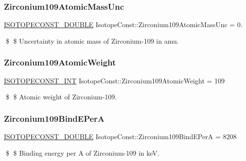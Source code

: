 \subsubsection{\texorpdfstring{Zirconium109\+Atomic\+Mass\+Unc}{Zirconium109AtomicMassUnc}}
{\footnotesize\ttfamily \mbox{\hyperlink{group___isotope_const-_macros_ga8f45a7272ce02c0b4c65c44636ed719a}{I\+S\+O\+T\+O\+P\+E\+C\+O\+N\+S\+T\+\_\+\+D\+O\+U\+B\+LE}} Isotope\+Const\+::\+Zirconium109\+Atomic\+Mass\+Unc = 0.}

\$ \$ Uncertainty in atomic mass of Zirconium-\/109 in amu. \mbox{\label{group___isotope_const-_zirconium-_zr109_gac8ba32c5e4ec25d93e46e86c0b66bd8c}} 
\subsubsection{\texorpdfstring{Zirconium109\+Atomic\+Weight}{Zirconium109AtomicWeight}}
{\footnotesize\ttfamily \mbox{\hyperlink{group___isotope_const-_macros_ga5f18360b3e99483a35c32d789e62621c}{I\+S\+O\+T\+O\+P\+E\+C\+O\+N\+S\+T\+\_\+\+I\+NT}} Isotope\+Const\+::\+Zirconium109\+Atomic\+Weight = 109}

\$ \$ Atomic weight of Zirconium-\/109. \mbox{\label{group___isotope_const-_zirconium-_zr109_ga442c5e51d714bdd8987e4f992dfe302e}} 
\subsubsection{\texorpdfstring{Zirconium109\+Bind\+E\+PerA}{Zirconium109BindEPerA}}
{\footnotesize\ttfamily \mbox{\hyperlink{group___isotope_const-_macros_ga8f45a7272ce02c0b4c65c44636ed719a}{I\+S\+O\+T\+O\+P\+E\+C\+O\+N\+S\+T\+\_\+\+D\+O\+U\+B\+LE}} Isotope\+Const\+::\+Zirconium109\+Bind\+E\+PerA = 8208}

\$ \$ Binding energy per A of Zirconium-\/109 in keV. \mbox{\label{group___isotope_const-_zirconium-_zr109_ga20b50135269bd1162f8f07e6dbb7c644}} 

